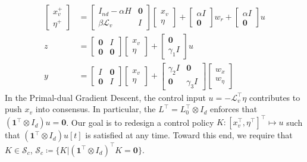\begin{equation}
\begin{split}\label{eqn::ss_sys}
\begin{bmatrix}
    x_v^ + \\
    \eta^+ 
\end{bmatrix}
& = \begin{bmatrix}
    I_{nd} - \alpha H & \mathbf{0}\\
    \beta \mathcal{L}_v & I
\end{bmatrix} 
\begin{bmatrix}
    x_v \\
    \eta 
\end{bmatrix} + \begin{bmatrix}
    \alpha I\\
    \mathbf{0}
\end{bmatrix} w_r +  \begin{bmatrix}
    \alpha I\\
    \mathbf{0}
\end{bmatrix} u \\
z & = \begin{bmatrix}
    \mathbf{0} & I\\
    \mathbf{0} & \mathbf{0} 
\end{bmatrix} \begin{bmatrix}
    x_v \\
    \eta 
\end{bmatrix} 
+ 
\begin{bmatrix}
    \mathbf{0}\\
    \gamma_1 I
\end{bmatrix} u \\
y & = 
\begin{bmatrix}
    I & \mathbf{0}\\
    \mathbf{0} & I
\end{bmatrix} \begin{bmatrix}
    x_v \\
    \eta 
\end{bmatrix}
+ \begin{bmatrix}
    \gamma_2 I & \mathbf{0}\\
    \mathbf{0} & \gamma_3 I
\end{bmatrix}
\begin{bmatrix}
    w_x \\
    w_\eta 
\end{bmatrix}
\end{split}   
\end{equation}
In the Primal-dual Gradient Descent, the control input \(u = - \mathcal{L}_v^\top \eta\) contributes to push \(x_v\) into consensus. In particular, the \(L^\top = L_0^\top \otimes I_d\) enforces that \((\mathbf{1}^\top \otimes I_d) u =\mathbf{0}\). Our goal is to redesign a control policy \(K\colon [x_v^\top,\eta^\top]^\top \mapsto u\) such that \((\mathbf{1}^\top \otimes I_d) u[t]\) is satisfied at any time. Toward this end, we require that \(K\in \mathcal{S}_c\), \(\mathcal{S}_c \coloneqq \{K\vert(\mathbf{1}^\top \otimes I_d)^\top K = \mathbf{0}\}\). 


